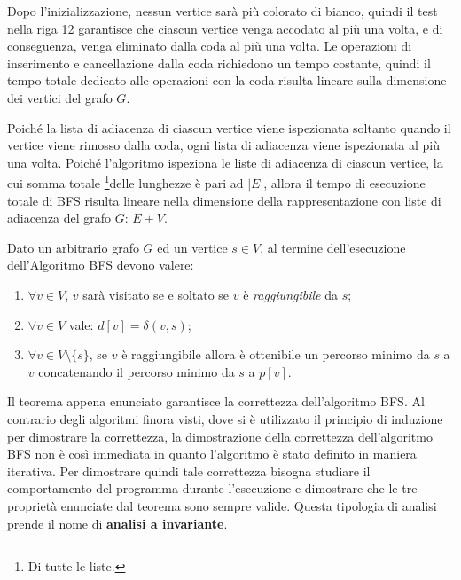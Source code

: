Dopo l'inizializzazione, nessun vertice sarà più colorato di bianco, quindi il test nella riga 12 garantisce che ciascun vertice venga accodato al più una volta, e di conseguenza, venga eliminato dalla coda al più una volta. Le operazioni di inserimento e cancellazione dalla coda richiedono un tempo costante, quindi il tempo totale dedicato alle operazioni con la coda risulta lineare sulla dimensione dei vertici del grafo $G$.

Poiché la lista di adiacenza di ciascun vertice viene ispezionata soltanto quando il vertice viene rimosso dalla coda, ogni lista di adiacenza viene ispezionata al più una volta. Poiché l'algoritmo ispeziona le liste di adiacenza di ciascun vertice, la cui somma totale \footnote{Di tutte le liste.}delle lunghezze è pari ad $|E|$, allora il tempo di esecuzione totale di \textsc{BFS} risulta lineare nella dimensione della rappresentazione con liste di adiacenza del grafo $G$: $E+V$.


\begin{teorbox}
	Dato un arbitrario grafo $G$ ed un vertice $s \in V$, al termine dell'esecuzione dell'Algoritmo \textsc{BFS} devono valere:
\begin{enumerate}
	\item $\forall v \in V$, $v$ sarà visitato se e soltato se $v$ è \textit{raggiungibile} da $s$;
	\item $\forall v \in V$ vale: $d[v] = \delta(v,s)$;
	\item $\forall v \in V\setminus\{s\}$, se $v$ è raggiungibile allora è ottenibile un percorso minimo da $s$ a $v$ concatenando il percorso minimo da $s$ a $p[v]$.
\end{enumerate}
\end{teorbox}

Il teorema appena enunciato garantisce la correttezza dell'algoritmo \textsc{BFS}. Al contrario degli algoritmi finora visti, dove si è utilizzato il principio di induzione per dimostrare la correttezza, la dimostrazione della correttezza dell'algoritmo \textsc{BFS} non è così immediata in quanto l'algoritmo è stato definito in maniera iterativa. Per dimostrare quindi tale correttezza bisogna studiare il comportamento del programma durante l'esecuzione e dimostrare che le tre proprietà enunciate dal teorema sono sempre valide. Questa tipologia di analisi prende il nome di \textbf{analisi a invariante}.

